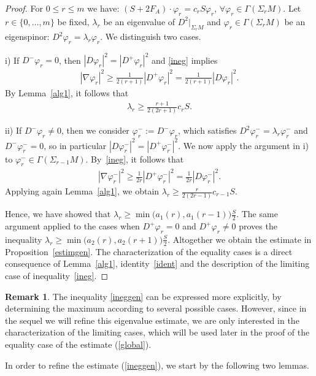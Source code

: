 \documentclass[10pt,a4paper]{amsart}
\numberwithin{equation}{section}
\theoremstyle{definition}
\newtheorem{Remark}[thm]{Remark}
\begin{document}
\begin{proof}
For $0\leq r\leq m$ we have: $(S +2 F_A )\cdot \varphi_r = c_r S  \varphi_r$, $\forall\varphi_r\in\Gamma(\Sigma_{r}M)$. Let $r\in\{0,\dots,m\}$ be f\/ixed, $\lambda_r$ be an eigenvalue of $D^2|_{\Sigma_r M}$ and $\varphi_r\in\Gamma(\Sigma_{r}M)$ be an eigenspinor: $D^2\varphi_r=\lambda_r\varphi_r$. We distinguish two cases.

i) If $D^-\varphi_r=0$, then $|D\varphi_r|^2=|D^+\varphi_r|^2$ and \eqref{ineg} implies
\begin{gather*}
|\nabla\varphi_r|^2\geq \frac{1}{2(r+1)}|D^+\varphi_r|^2=\frac{1}{2(r+1)}|D\varphi_r|^2.
\end{gather*}
By Lemma~\ref{alg1},  it follows that
\begin{gather*}\lambda_r\geq\frac{r+1}{2(2r+1)}c_rS. \end{gather*}

 ii) If $D^-\varphi_r\neq 0$, then we consider $\varphi_r^-:= D^-\varphi_r$, which satisf\/ies $D^2\varphi_r^-=\lambda_r\varphi_r^-$ and $D^-\varphi_r^-=0$,  so in particular $|D\varphi_r^-|^2=|D^+\varphi_r^-|^2$. We now apply the argument in i) to $\varphi_r^-\in\Gamma(\Sigma_{r-1}M)$. By~\eqref{ineg}, it follows that
\begin{gather*}
|\nabla\varphi_r^-|^2\geq \frac{1}{2r}|D^+\varphi_r^-|^2=\frac{1}{2r}|D\varphi_r^-|^2.
\end{gather*}
Applying again Lemma~\ref{alg1}, we obtain $\lambda_r\geq\frac{r}{2(2r-1)} c_{r-1} S$.


Hence, we  have showed that $\lambda_r\geq \min\big (a_1(r), a_1(r-1)\big)\frac{S}{2}$. The same argument applied to the cases when $D^+\varphi_r=0$ and $D^+\varphi_r\neq 0$ proves the inequality $\lambda_r\geq \min\big (a_2(r), a_2(r+1)\big ) \frac{S}{2}$. Altogether we obtain the estimate in Proposition~\ref{estimgen}. The characterization of the equality cases is a direct consequence of Lemma~\ref{alg1}, identity~\eqref{ident} and the description of  the limiting case of inequality~\eqref{ineg}.
\end{proof}

\begin{Remark}
The inequality \eqref{ineggen} can be expressed more explicitly, by determining the maximum according to several possible cases. However, since in the sequel we will ref\/ine this eigenvalue estimate, we are only interested in the characterization of the limiting cases, which will be used later in the proof of  the equality case of the estimate (\ref{global}).
\end{Remark}
In order to ref\/ine the estimate (\ref{ineggen}), we start by the following two lemmas.
\end{document}

